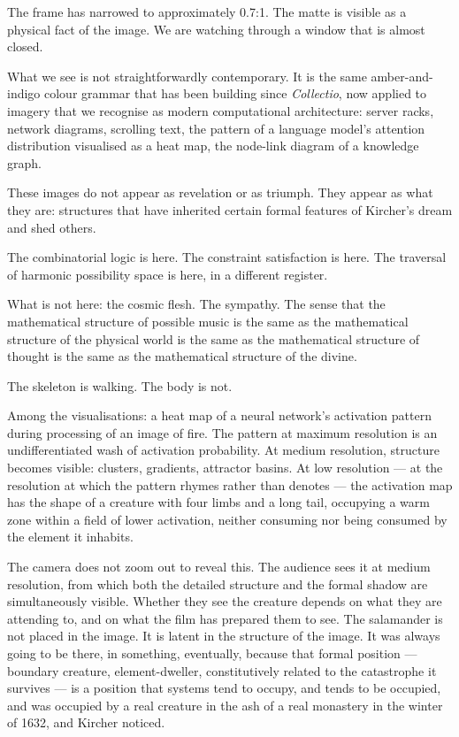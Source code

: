 \documentclass[12pt, a4paper, twoside]{memoir}
\theoremstyle{definition}
\theoremstyle{remark}
\newenvironment{action}{%
  \vspace{4pt}%
  \noindent\begin{minipage}{\linewidth}%
  \setlength{\parindent}{0pt}%
  \itshape\color{kircherink}%
}{%
  \end{minipage}\vspace{6pt}%
}
\newcommand{\salamander}[1]{%
  \marginnote{\color{arkgold!80}\scriptsize\bfseries[S\,#1]}%
}
\begin{document}
\begin{action}
The frame has narrowed to approximately 0.7:1. The matte is visible as a physical fact of the image. We are watching through a window that is almost closed.

What we see is not straightforwardly contemporary. It is the same amber-and-indigo colour grammar that has been building since \textit{Collectio}, now applied to imagery that we recognise as modern computational architecture: server racks, network diagrams, scrolling text, the pattern of a language model's attention distribution visualised as a heat map, the node-link diagram of a knowledge graph.

These images do not appear as revelation or as triumph. They appear as what they are: structures that have inherited certain formal features of Kircher's dream and shed others.

The combinatorial logic is here. The constraint satisfaction is here. The traversal of harmonic possibility space is here, in a different register.

What is not here: the cosmic flesh. The sympathy. The sense that the mathematical structure of possible music is the same as the mathematical structure of the physical world is the same as the mathematical structure of thought is the same as the mathematical structure of the divine.

The skeleton is walking. The body is not.
\end{action}

\begin{action}
\salamander{IV} Among the visualisations: a heat map of a neural network's activation pattern during processing of an image of fire. The pattern at maximum resolution is an undifferentiated wash of activation probability. At medium resolution, structure becomes visible: clusters, gradients, attractor basins. At low resolution --- at the resolution at which the pattern rhymes rather than denotes --- the activation map has the shape of a creature with four limbs and a long tail, occupying a warm zone within a field of lower activation, neither consuming nor being consumed by the element it inhabits.

The camera does not zoom out to reveal this. The audience sees it at medium resolution, from which both the detailed structure and the formal shadow are simultaneously visible. Whether they see the creature depends on what they are attending to, and on what the film has prepared them to see. The salamander is not placed in the image. It is latent in the structure of the image. It was always going to be there, in something, eventually, because that formal position --- boundary creature, element-dweller, constitutively related to the catastrophe it survives --- is a position that systems tend to occupy, and tends to be occupied, and was occupied by a real creature in the ash of a real monastery in the winter of 1632, and Kircher noticed.
\end{action}
\end{document}
